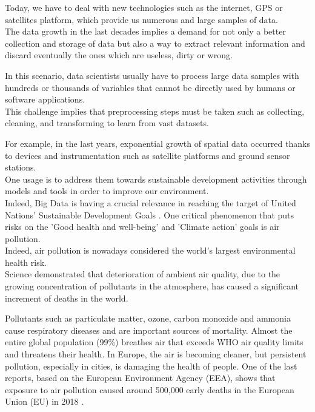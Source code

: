 Today, we have to deal with new technologies such as the internet, GPS or satellites platform, which provide us numerous and large samples of data.\\ 
The data growth in the last decades implies a demand for not only a better collection and storage of data but also a way to extract relevant information and discard eventually the ones which are useless, dirty or wrong.\par
In this scenario, data scientists usually have to process large data samples with hundreds or thousands of variables that  \cite{garcia2016big} cannot be directly used by humans or software applications.\\
This challenge implies that preprocessing steps must be taken such as collecting, cleaning, and transforming to learn from vast datasets.\par
For example, in the last years, exponential growth of spatial data occurred thanks to devices and instrumentation such as satellite platforms and ground sensor stations. \\
One usage is to address them towards sustainable development activities through models and tools in order to improve our environment. \\
Indeed, Big Data is having a crucial relevance in reaching the target of United Nations’ Sustainable Development Goals  \cite{zhang2019orchestrating}.
One critical phenomenon that puts risks on the 'Good health and well-being' and 'Climate action' goals is air pollution.\\
Indeed, air pollution is nowadays considered the world's largest environmental health risk.\\
Science demonstrated that deterioration of ambient air quality, due to the growing concentration of pollutants in the atmosphere, has caused a significant increment of deaths in the world.\par  
Pollutants such as particulate matter, ozone, carbon monoxide and ammonia cause respiratory diseases and are important sources of mortality.
Almost the entire global population (99\%) breathes air that exceeds WHO air quality limits and threatens their health.\newline
In Europe, the air is becoming cleaner, but persistent pollution, especially in cities, is damaging the health of people. One of the last reports, based on the European Environment Agency (EEA), shows that exposure to air pollution caused around 500,000 early deaths in the European Union (EU) in 2018  \cite{european2018air}.\par
